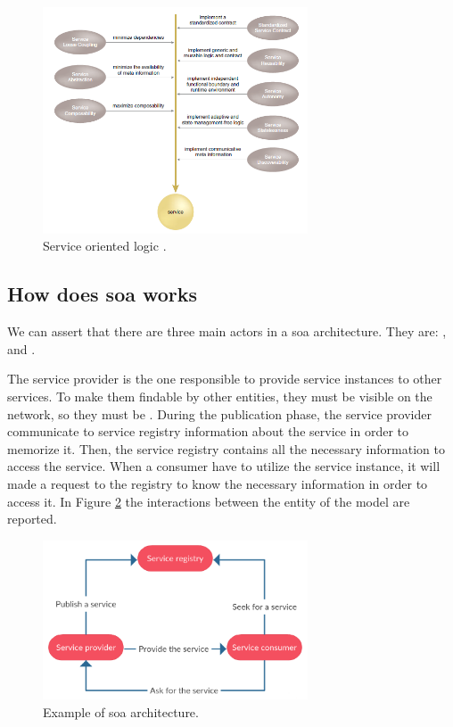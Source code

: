 \begin{figure}
	\centering{}
	\includegraphics[width=0.7\textwidth]{chapters/architecture/images/soa-characteristics.png}
	\caption[Service oriented logic]{Service oriented logic \cite{serviceCharacteristics}.}
	\label{img:architecture-soa-characteristics}
\end{figure}

\subsection{How does \acs{soa} works}
\label{sec:architecture-soa-workmodel}
We can assert that there are three main actors in a \ac{soa} architecture. They are: ,  and .

The service provider is the one responsible to provide service instances to other services. To make
them findable by other entities, they must be visible on the network, so they must be
. During the publication phase, the service provider communicate to service registry
information about the service in order to memorize it. Then, the service registry contains all the
necessary information to access the service. When a consumer have to utilize the service instance, it
will made a request to the registry to know the necessary information in order to access it. In Figure
\ref{img:architecture-soa-workmodel} the interactions between the entity of the model are reported.

\begin{figure}
	\centering{}
	\includegraphics[width=0.7\textwidth]{chapters/architecture/images/soa-workmodel.png}
	\caption[Example of \acs{SOA} architecture]{Example of \acf{soa} architecture.}
	\label{img:architecture-soa-workmodel}
\end{figure}

